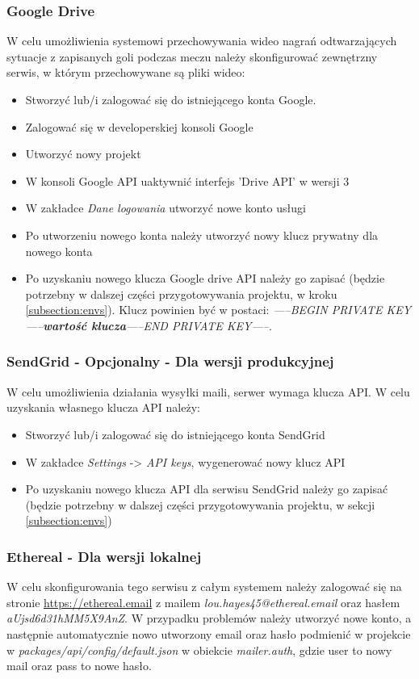 \subsubsection{Google Drive}
W celu umożliwienia systemowi przechowywania wideo nagrań odtwarzających sytuacje z zapisanych goli podczas meczu należy skonfigurować zewnętrzny serwis, w którym przechowywane są pliki wideo:

\begin{itemize}
	\item Stworzyć lub/i zalogować się do istniejącego konta Google.
	\item Zalogować się w developerskiej konsoli Google
	\item Utworzyć nowy projekt
	\item W konsoli Google API uaktywnić interfejs 'Drive API' w wersji 3
	\item W zakładce \textit{Dane logowania} utworzyć nowe konto usługi
	\item Po utworzeniu nowego konta należy utworzyć nowy klucz prywatny dla nowego konta
  \item Po uzyskaniu nowego klucza Google drive API należy go zapisać  (będzie potrzebny w dalszej części przygotowywania projektu, w kroku \ref{subsection:envs}). Klucz powinien być w postaci: \newline \textit{-----BEGIN PRIVATE KEY-----\textbf{wartość klucza}-----END PRIVATE KEY-----}.
\end{itemize}


\subsubsection{SendGrid - Opcjonalny - Dla wersji produkcyjnej}
W celu umożliwienia działania wysyłki maili, serwer wymaga klucza API. W celu uzyskania własnego klucza API należy:

\begin{itemize}
	\item Stworzyć lub/i zalogować się do istniejącego konta SendGrid
	\item W zakładce \textit{Settings} -> \textit{API keys}, wygenerować nowy klucz API
	\item Po uzyskaniu nowego klucza API dla serwisu SendGrid należy go zapisać (będzie potrzebny w dalszej części przygotowywania projektu, w sekcji \ref{subsection:envs})
\end{itemize}

\label{application:preparation:etheral}
\subsubsection{Ethereal - Dla wersji lokalnej}
W celu skonfigurowania tego serwisu z całym systemem należy zalogować się na stronie \url{https://ethereal.email} z mailem
\textit{lou.hayes45@ethereal.email} oraz hasłem \textit{aUjsd6d31hMM5X9AnZ}. W przypadku problemów należy utworzyć nowe konto, a następnie automatycznie nowo utworzony email oraz hasło podmienić w projekcie w \textit{packages/api/config/default.json} w obiekcie \textit{mailer.auth}, gdzie user to nowy mail oraz pass to nowe hasło.


